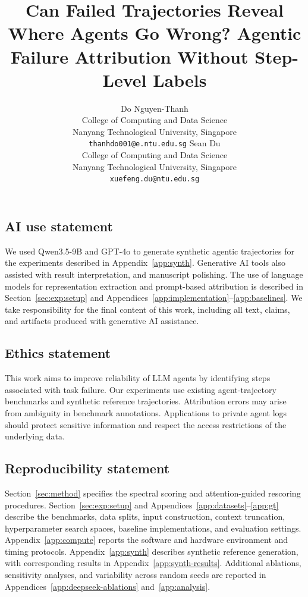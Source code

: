\documentclass{article} %
\title{Can Failed Trajectories Reveal Where Agents Go Wrong? Agentic Failure Attribution Without Step-Level Labels}
\author{
Do Nguyen-Thanh \\
College of Computing and Data Science \\
Nanyang Technological University, Singapore \\
\texttt{thanhdo001@e.ntu.edu.sg}
\And
Sean Du \\
College of Computing and Data Science \\
Nanyang Technological University, Singapore \\
\texttt{xuefeng.du@ntu.edu.sg}
}
\begin{document}
\maketitle
% 
% 
% 
% 





% 







\subsection*{AI use statement}

We used Qwen3.5-9B and GPT-4o to generate synthetic agentic trajectories
for the experiments described in Appendix~\ref{app:synth}. Generative AI tools also
assisted with result interpretation, and  manuscript polishing. The use of language models for representation
extraction and prompt-based attribution is described in Section~\ref{sec:exp:setup} and
Appendices~\ref{app:implementation}--\ref{app:baselines}.
We take responsibility for the final content of this work, including
all text, claims, and artifacts produced with generative AI assistance.

\subsection*{Ethics statement}

This work aims to improve  reliability of LLM agents by identifying
steps associated with task failure. Our experiments use existing
agent-trajectory benchmarks and synthetic reference trajectories.
Attribution errors may arise from  ambiguity in benchmark annotations. Applications to
private agent logs should protect sensitive information and respect
the access restrictions of the underlying data.

\subsection*{Reproducibility statement}

Section~\ref{sec:method} specifies the spectral scoring and attention-guided rescoring
procedures. Section~\ref{sec:exp:setup} and Appendices~\ref{app:datasets}--\ref{app:gt} describe the benchmarks,
data splits, input construction, context truncation, hyperparameter
search spaces, baseline implementations, and evaluation settings.
Appendix~\ref{app:compute} reports the software and hardware environment and timing
protocols. Appendix~\ref{app:synth} describes synthetic reference generation, with
corresponding results in Appendix~\ref{app:synth-results}. Additional ablations, sensitivity
analyses, and variability across random seeds are reported in
Appendices~\ref{app:deepseek-ablations} and~\ref{app:analysis}.
\end{document}
